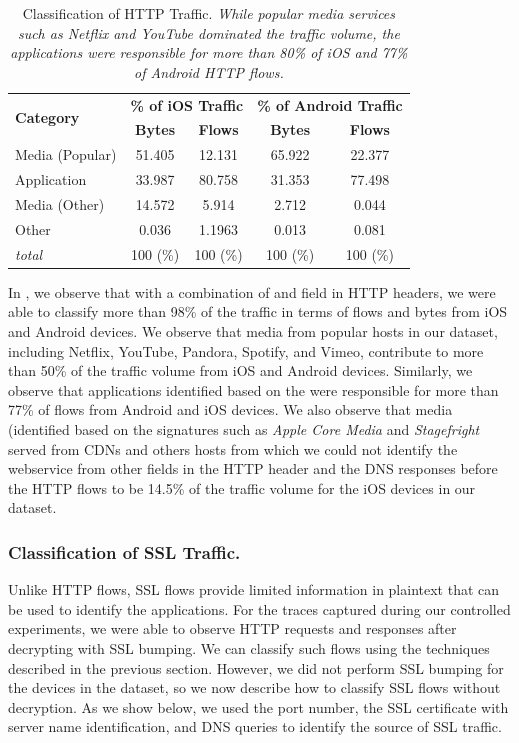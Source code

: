 \begin{table}
\centering
\begin{small}
\begin{tabular}{|p{}|c|c|c|c|}
\hline
\multirow{2}{*}{\bf Category} & \multicolumn{2}{c|}{\bf \% of iOS Traffic } &  \multicolumn{2}{c|}{\bf \% of Android Traffic } \tabularnewline
\cline{2-5}
  & {\bf Bytes}  & {\bf Flows} & {\bf Bytes} & {\bf Flows}   \tabularnewline
\hline
Media (Popular)         & 51.405  & 12.131 & 65.922 & 22.377 \tabularnewline
\hline
Application             & 33.987  & 80.758 & 31.353 & 77.498 \tabularnewline
\hline
Media (Other)           & 14.572  &  5.914 &  2.712 &  0.044 \tabularnewline
\hline
Other                   &  0.036  & 1.1963 &  0.013 &  0.081 \tabularnewline
\hline
{\em total}             & 100 (\%)& 100 (\%)& 100 (\%) & 100 (\%) \tabularnewline
\hline
\end{tabular}
\end{small}
\caption{Classification of HTTP Traffic. \emph{While popular media services such as Netflix and YouTube dominated the traffic volume, the applications were responsible for more than 80\% of iOS and 77\% of Android HTTP flows.}}
\label{tab:classify-http}
\end{table}

In , we observe that with a combination of \useragent and \httphost field in HTTP headers, we were able to classify more than 98\% of the traffic in terms of flows and bytes from iOS and Android devices.
We observe that media from popular hosts in our \mobWild dataset, including Netflix, YouTube, Pandora, Spotify, and Vimeo, contribute to more than 50\% of the traffic volume from iOS and Android devices.
Similarly, we observe that applications identified based on the \useragent  were responsible for more than 77\% of flows from Android and iOS devices. 
We also observe that media (identified based on the signatures such as \emph{Apple Core Media} and \emph{Stagefright} served from CDNs and others hosts from which we could not identify the webservice from other fields in the HTTP header and the DNS responses before the HTTP flows to be 14.5\% of the traffic volume for the iOS devices in our dataset.

\subsubsection{Classification of SSL Traffic.}

Unlike HTTP flows, SSL flows provide limited information in plaintext that can be used to identify the applications. 
For the traces captured during our controlled experiments, we were able to observe HTTP requests and responses 
after decrypting with SSL bumping. We can classify such flows using the techniques described in the previous section. 
However, we did not perform SSL bumping for the devices in the \mobWild dataset, so we now describe how to 
classify SSL flows without decryption. As we show below, we used the port number, the SSL certificate with server 
name identification, and DNS queries to identify the source of SSL traffic. 

